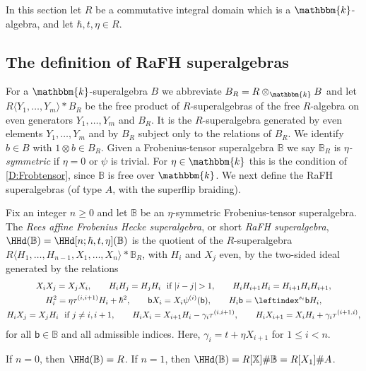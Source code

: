 \documentclass[a4paper,11pt]{amsart}
\let\<\langle
\let\>\rangle
\numberwithin{equation}{subsection}
\theoremstyle{definition}
\theoremstyle{theorem}
\theoremstyle{remark}
\newcommand\bb{\mathsf{b}}
\newcommand\X{\mathbb{X}}
\newcommand\kk{\mathbbm{k}}
\newcommand\RR{R}
\newcommand{\Bo}{\mathbb{B}}
\begin{document}
In this section let $\RR$ be a commutative integral domain which is a $\kk$-algebra, and let $\hbar,t,\eta\in R$.

\subsection{The definition of  RaFH superalgebras}\label{defRaFH}
For a $\kk$-superalgebra $B$ we abbreviate $B_R=R\otimes_\kk B$ and let
$R\<Y_1,\dots,Y_m\>\ast B_R$ be the free product of $R$-superalgebras of the
free $R$-algebra on even generators $Y_1,\dots,Y_m$ and $B_R$. It is the $R$-superalgebra generated by
even elements $Y_1,\dots,Y_m$ and by $B_R$  subject only to the relations of $B_R$. We identify $b\in B$
with $1\otimes b \in B_R$. Given a  Frobenius-tensor superalgebra $\Bo$ we say $\Bo_R$ is  \emph{$\eta$-symmetric} if $\eta=0$ or $\psi$ is trivial. For $\eta\in\kk$ this is the condition of
\autoref{D:Frobtensor}, since $\Bo$ is free over $\kk$. We next define the RaFH superalgebras (of type $A$, with the superflip braiding).
\begin{Definition}\label{D:Hecke}
  Fix an integer $n\ge0$ and let $\Bo$ be an $\eta$-symmetric Frobenius-tensor superalgebra.
  The \emph{Rees affine Frobenius Hecke superalgebra}, or short \emph{RaFH superalgebra},
  $\HHd(\Bo)=\HHd[n;\hbar,t,\eta](\Bo)$ is the quotient of the
  $R$-superalgebra $R\<H_1,\dots,H_{n-1},X_1,\dots,X_n\>\ast \Bo_R$, with $H_i$ and $X_j$ even,
  by the two-sided ideal generated by the relations
  \begin{equation}\label{RaFHrels}
  \begin{gathered}
    X_iX_j=X_jX_i,\qquad
    H_iH_j=H_jH_i\ \text{ if }|i-j|>1,\qquad
    H_iH_{i+1}H_i=H_{i+1}H_iH_{i+1},\\
    H_i^2=\eta\tau^{(i,i+1)}H_i+\hbar^2,\qquad
    \bb X_i=X_i\psi^{(i)}(\bb),\qquad
    H_i\bb=\leftindex^{s_i}{\bb}H_i,\\
    H_iX_j=X_jH_i\ \text{ if }j\ne i,i+1,\qquad
    H_iX_i=X_{i+1}H_i-\gamma_i\tau^{(i,i+1)},\qquad
    H_iX_{i+1}=X_iH_i+\gamma_i\tau^{(i+1,i)},
  \end{gathered}
  \end{equation}
  for all $\bb\in\Bo$ and all admissible indices. Here,
  $\gamma_i=t+\eta X_{i+1}$ for $1\leq i<n$.
\end{Definition}

  \begin{Remark}
    If $n=0$, then $\HHd(\Bo)=R$. If $n=1$, then
    $\HHd(\Bo)=R[\X]\#\Bo=R[X_1]\#A$.
  \end{Remark}
\end{document}
